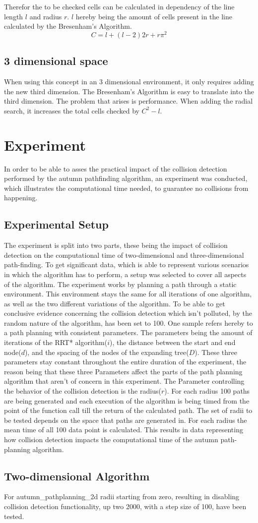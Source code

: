 Therefor the to be checked cells can be calculated in dependency of the line length $l$ and radius $r$. $l$ hereby being the amount of cells present in the line calculated by the Bresenham's Algorithm. 
\[C=l+(l-2)2r+r\pi^2\]

\subsection{3 dimensional space}
When using this concept in an 3 dimensional environment, it only requires adding the new third dimension. The Bresenham's Algorithm is easy to translate into the third dimension. The problem that arises is performance. When adding the radial search, it increases the total cells checked by \(C^2 - l\).  

\section{Experiment}

In order to be able to asses the practical impact of the collision detection performed by the autumn pathfinding algorithm, an experiment was conducted, which illustrates the computational time needed, to guarantee no collisions from happening.

\subsection{Experimental Setup}

The experiment is split into two parts, these being the impact of collision detection on the computational time of two-dimensional and three-dimensional path-finding.
To get significant data, which is able to represent various scenarios in which the algorithm has to perform, a setup was selected to cover all aspects of the algorithm. The experiment works by planning a path through a static environment. This environment stays the same for all iterations of one algorithm, as well as the two different variations of the algorithm. To be able to get conclusive evidence concerning the collision detection which isn't polluted, by the random nature of the algorithm, has been set to 100. One sample refers hereby to a path planning with consistent parameters. The parameters being the amount of iterations of the RRT* algorithm($i$), the distance between the start and end node($d$), and the spacing of the nodes of the expanding tree($D$). These three parameters stay constant throughout the entire duration of the experiment, the reason being that these three Parameters affect the parts of the path planning algorithm that aren't of concern in this experiment. The Parameter controlling the behavior of the collision detection is the radius($r$).
For each radius 100 paths are being generated and each execution of the algorithm is being timed from the point of the function call till the return of the calculated path. 
The set of radii to be tested depends on the space that paths are generated in.
For each radius the mean time of all 100 data point is calculated. This results in data representing how collision detection impacts the computational time of the autumn path-planning algorithm.

\subsection{Two-dimensional Algorithm}

For autumn\_pathplanning\_2d radii starting from zero, resulting in disabling collision detection functionality, up two 2000, with a step size of 100, have been tested. 
